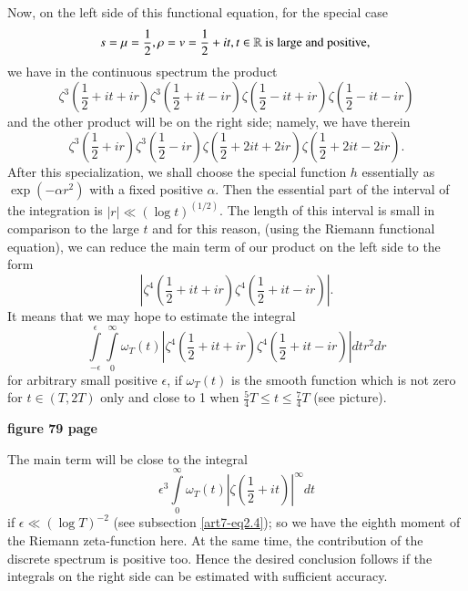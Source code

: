 Now, on the left side of this functional equation, for the special case
\begin{equation}
s = \mu =\frac{1}{2}, \rho = v = \frac{1}{2} + it, t \in \mathbb{R} \text{ is large and positive, }\label{art7-eq2.16}
\end{equation}
we have in the continuous spectrum the product
\begin{equation}
\zeta^3 (\frac{1}{2} + it + ir) \zeta^3 (\frac{1}{2} + it - ir) \zeta (\frac{1}{2} - it + ir) \zeta(\frac{1}{2} - it - ir) \label{art7-eq2.17}
\end{equation}
and the other product will be on the right side; namely, we have therein 
\begin{equation}
\zeta^3 (\frac{1}{2} + ir) \zeta^3 (\frac{1}{2} - ir) \zeta (\frac{1}{2} + 2 it + 2 ir) \zeta (\frac{1}{2} + 2 it - 2 ir). 
\label{art7-eq2.18}
\end{equation}
After this specialization, we shall choose the special function $h$ essentially as $\exp (-\alpha r^2)$ with a fixed positive $\alpha$. Then the essential part of the interval of the integration is $|r| \ll (\log t)^{(1/2)}$. The length of this interval is small in comparison to the large $t$ and for this reason, (using the Riemann functional equation), we can reduce the main term of our product on the left side to the form 
$$
|\zeta^4 (\frac{1}{2} + it + ir) \zeta^4 (\frac{1}{2} + it - ir)|. 
$$\pageoriginale
It means that we may hope to estimate the integral 
\begin{equation}
\int\limits^\epsilon_{-\epsilon} \int\limits^\infty_{0} \omega_T (t) |\zeta^4 (\frac{1}{2} + it+ ir) \zeta^4 (\frac{1}{2} + it - ir)| dt r^2 dr  \label{art7-eq2.19}
\end{equation}
for arbitrary small positive $\epsilon$, if $\omega_T (t)$ is the smooth function which is not zero for $t \in (T, 2 T)$ only and close to 1 when $\frac{5}{4} T \leqslant t \leqslant \frac{7}{4} T$ (see picture).
\begin{center}
{\bf figure 79 page}
\end{center}
The main term will be close to the integral
$$
\epsilon^3 \int\limits^\infty_0 \omega_T (t) |\zeta (\frac{1}{2} + it)|^\infty dt 
$$
if $\epsilon \ll (\log T)^{-2}$ (see subsection \eqref{art7-eq2.4}); so we have the eighth moment of the Riemann zeta-function here. At the same time, the contribution of the discrete spectrum is positive too. Hence the desired conclusion follows if the integrals on the right side can be estimated with sufficient accuracy. 

